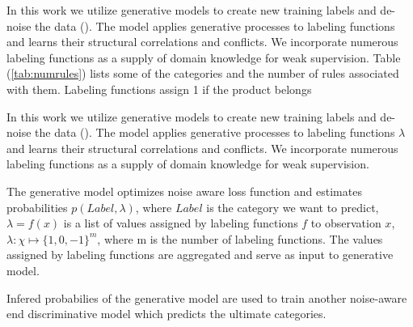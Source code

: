
In this work we utilize generative models to create new training labels and de-noise the data (\cite{Ratner2016}).
The model applies generative processes to labeling functions and learns their structural correlations and conflicts.
We incorporate numerous labeling functions as a supply of domain knowledge for weak supervision. Table (\ref{tab:numrules})
lists some of the categories and the number of rules associated with them. Labeling functions assign 1 if the product belongs

In this work we utilize generative models to create new training labels and de-noise the data (\cite{Ratner2016}).
The model applies generative processes to labeling functions $\lambda$ and learns their structural correlations and conflicts.
We incorporate numerous labeling functions as a supply of domain knowledge for weak supervision.

The generative model optimizes noise aware loss function and estimates probabilities $p(Label, \lambda)$,
where $Label$ is the category we want to predict, $\lambda = f(x)$ is a list of values assigned by labeling
functions $f$ to observation $x$, $\lambda : \chi \mapsto \{1, 0, -1\}^m$, where m is the number of labeling functions.
The values assigned by labeling functions are aggregated and serve as input to generative model.

Infered probabilies of the generative model are used to train another noise-aware end discriminative model which
predicts the ultimate categories.

